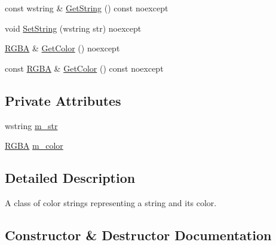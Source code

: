 \begin{DoxyCompactItemize}
\item 
const wstring \& \mbox{\hyperlink{classmage_1_1rendering_1_1_color_string_a146cf063553b65b3cd854417b638b533}{Get\+String}} () const noexcept
\item 
void \mbox{\hyperlink{classmage_1_1rendering_1_1_color_string_aefee43f68f87617976f89430bac71fba}{Set\+String}} (wstring str) noexcept
\item 
\mbox{\hyperlink{structmage_1_1_r_g_b_a}{R\+G\+BA}} \& \mbox{\hyperlink{classmage_1_1rendering_1_1_color_string_a396ed7da3f3b27068b05c1ead9816046}{Get\+Color}} () noexcept
\item 
const \mbox{\hyperlink{structmage_1_1_r_g_b_a}{R\+G\+BA}} \& \mbox{\hyperlink{classmage_1_1rendering_1_1_color_string_a08bd67511180f15e902ce34dd402fe82}{Get\+Color}} () const noexcept
\end{DoxyCompactItemize}
\subsection*{Private Attributes}
\begin{DoxyCompactItemize}
\item 
wstring \mbox{\hyperlink{classmage_1_1rendering_1_1_color_string_a226202625fbe205d78e1412310a49f1f}{m\+\_\+str}}
\item 
\mbox{\hyperlink{structmage_1_1_r_g_b_a}{R\+G\+BA}} \mbox{\hyperlink{classmage_1_1rendering_1_1_color_string_a6b062bfa44b3786c5e8f2e8d18a373ca}{m\+\_\+color}}
\end{DoxyCompactItemize}


\subsection{Detailed Description}
A class of color strings representing a string and its color. 

\subsection{Constructor \& Destructor Documentation}
\mbox{\label{classmage_1_1rendering_1_1_color_string_af574d1a87d78ed0315f4f6279cd167ae}} 
